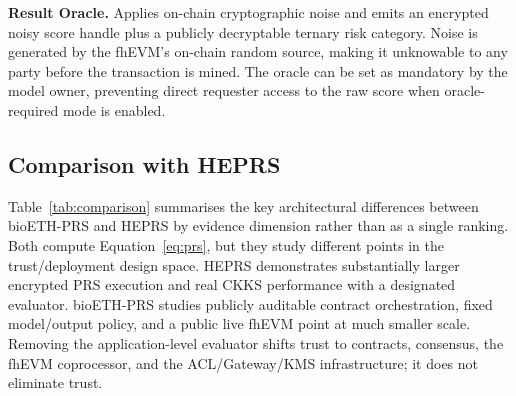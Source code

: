 \documentclass[10pt,twocolumn]{article}
\begin{document}
\textbf{Result Oracle.}
Applies on-chain cryptographic noise and emits an encrypted noisy score handle plus
a publicly decryptable ternary risk category.  Noise is generated by the fhEVM's on-chain
random source, making it unknowable to any party before the transaction is mined.  The
oracle can be set as mandatory by the model owner, preventing direct requester access to
the raw score when oracle-required mode is enabled.

\subsection{Comparison with HEPRS}

Table~\ref{tab:comparison} summarises the key architectural differences between
bioETH-PRS and HEPRS \citep{knight2026heprs} by evidence dimension rather than as a
single ranking.  Both compute Equation~\ref{eq:prs}, but they study different points in
the trust/deployment design space.  HEPRS demonstrates substantially larger encrypted
PRS execution and real CKKS performance with a designated evaluator.  bioETH-PRS
studies publicly auditable contract orchestration, fixed model/output policy, and a
public live fhEVM point at much smaller scale.  Removing the application-level
evaluator shifts trust to contracts, consensus, the fhEVM coprocessor, and the
ACL/Gateway/KMS infrastructure; it does not eliminate trust.
\end{document}
